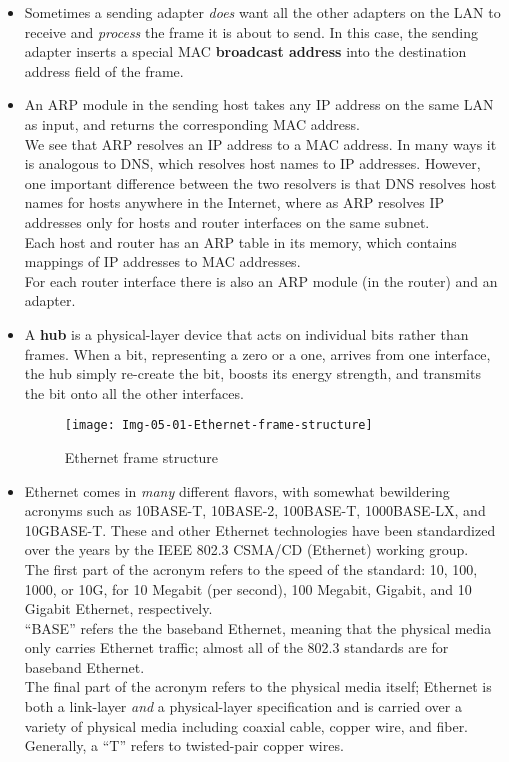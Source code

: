 \begin{itemize}
\item
Sometimes a sending adapter \textit{does} want all the other adapters on the LAN to receive and \textit{process} the frame it is about to send. In this case, the sending adapter inserts a special MAC \textbf{broadcast address} into the destination address field of the frame.

\item
An ARP module in the sending host takes any IP address on the same LAN as input, and returns the corresponding MAC address.\\
We see that ARP resolves an IP address to a MAC address. In many ways it is analogous to DNS, which resolves host names to IP addresses. However, one important difference between the two resolvers is that DNS resolves host names for hosts anywhere in the Internet, where as ARP resolves IP addresses only for hosts and router interfaces on the same subnet.\\
Each host and router has an ARP table in its memory, which contains mappings of IP addresses to MAC addresses.\\
For each router interface there is also an ARP module (in the router) and an adapter.

\item
A \textbf{hub} is a physical-layer device that acts on individual bits rather than frames. When a bit, representing a zero or a one, arrives from one interface, the hub simply re-create the bit, boosts its energy strength, and transmits the bit onto all the other interfaces.

\begin{figure}[h]
\texttt{[image: Img-05-01-Ethernet-frame-structure]}
\centering
\caption{Ethernet frame structure}
\label{fig:fig-05-01}
\end{figure}

\item
Ethernet comes in \textit{many} different flavors, with somewhat bewildering acronyms such as 10BASE-T, 10BASE-2, 100BASE-T, 1000BASE-LX, and 10GBASE-T. These and other Ethernet technologies have been standardized over the years by the IEEE 802.3 CSMA/CD (Ethernet) working group.\\
The first part of the acronym refers to the speed of the standard: 10, 100, 1000, or 10G, for 10 Megabit (per second), 100 Megabit, Gigabit, and 10 Gigabit Ethernet, respectively.\\
``BASE'' refers the the baseband Ethernet, meaning that the physical media only carries Ethernet traffic; almost all of the 802.3 standards are for baseband Ethernet.\\
The final part of the acronym refers to the physical media itself; Ethernet is both a link-layer \textit{and} a physical-layer specification and is carried over a variety of physical media including coaxial cable, copper wire, and fiber. Generally, a ``T'' refers to twisted-pair copper wires.


\end{itemize}
